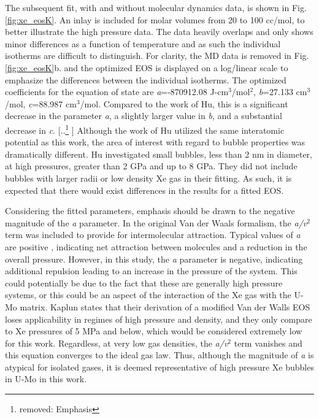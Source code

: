 \documentclass[review]{elsarticle}
\providecommand{\DIFaddtex}[1]{{\protect\color{blue} \sf #1}} %
\providecommand{\DIFdeltex}[1]{{\protect\color{red} [..\footnote{removed: #1} ]}} %
\providecommand{\DIFaddbegin}{} %
\providecommand{\DIFaddend}{} %
\providecommand{\DIFdelbegin}{} %
\providecommand{\DIFdelend}{} %
\providecommand{\DIFadd}[1]{\texorpdfstring{\DIFaddtex{#1}}{#1}} %
\providecommand{\DIFdel}[1]{\texorpdfstring{\DIFdeltex{#1}}{}} %
\newcommand{\DIFscaledelfig}{0.5}
\newlength{\DIFdelgraphicswidth} %
\newlength{\DIFdelgraphicsheight} %
\newcommand{\DIFaddincludegraphics}[2][]{{\color{blue}\fbox{\DIFOincludegraphics[#1]{#2}}}} %
\newcommand{\DIFdelincludegraphics}[2][]{%
\sbox{\DIFdelgraphicsbox}{\DIFOincludegraphics[#1]{#2}}%
\settoboxwidth{\DIFdelgraphicswidth}{\DIFdelgraphicsbox} %
\settoboxtotalheight{\DIFdelgraphicsheight}{\DIFdelgraphicsbox} %
\scalebox{\DIFscaledelfig}{%
\parbox[b]{\DIFdelgraphicswidth}{\usebox{\DIFdelgraphicsbox}\\[-\baselineskip] \rule{\DIFdelgraphicswidth}{0em}}\llap{\resizebox{\DIFdelgraphicswidth}{\DIFdelgraphicsheight}{%
\setlength{\unitlength}{\DIFdelgraphicswidth}%
\begin{picture}(1,1)%
\thicklines\linethickness{2pt} %
{\color[rgb]{1,0,0}\put(0,0){\framebox(1,1){}}}%
{\color[rgb]{1,0,0}\put(0,0){\line( 1,1){1}}}%
{\color[rgb]{1,0,0}\put(0,1){\line(1,-1){1}}}%
\end{picture}%
}\hspace*{3pt}}} %
} %
\DeclareRobustCommand{\DIFaddbegin}{\DIFOaddbegin \let\includegraphics\DIFaddincludegraphics} %
\DeclareRobustCommand{\DIFaddend}{\DIFOaddend \let\includegraphics\DIFOincludegraphics} %
\DeclareRobustCommand{\DIFdelbegin}{\DIFOdelbegin \let\includegraphics\DIFdelincludegraphics} %
\DeclareRobustCommand{\DIFdelend}{\DIFOaddend \let\includegraphics\DIFOincludegraphics} %
\begin{document}
The subsequent fit, with and without molecular dynamics data, is shown in Fig. \ref{fig:xe_eosK}. An inlay is included for molar volumes from 20 to 100 cc/mol, to better illustrate the high pressure data. The data heavily overlaps and only shows minor differences as a function of temperature and as such the individual isotherms are difficult to distinguish. For clarity, the MD data is removed in Fig. \ref{fig:xe_eosK}b. and the optimized EOS is displayed on a log/linear scale to emphasize the differences between the individual isotherms. The optimized coefficients for the equation of state are \textit{a}=-870912.08 J-cm$^3$/mol$^2$, \textit{b}=27.133 cm$^3$/mol, \textit{c}=88.987 cm$^3$/mol. Compared to the work of Hu, this is a significant decrease in the parameter \textit{a}, a slightly larger value in \textit{b}, and a substantial decrease in \textit{c}. \DIFdelbegin \DIFdel{Emphasis }\DIFdelend \DIFaddbegin \DIFadd{Although the work of Hu utilized the same interatomic potential as this work, the area of interest with regard to bubble properties was dramatically different. Hu investigated small bubbles, less than 2 nm in diameter, at high pressures, greater than 2 GPa and up to 8 GPa. They did not include bubbles with larger radii or low density Xe gas in their fitting.  As such, it is expected that there would exist differences in the results for a fitted EOS. 
}

\DIFadd{Considering the fitted parameters, emphasis }\DIFaddend should be drawn to the negative magnitude of the \textit{a} parameter. In the original Van der Waals formalism, the \textit{a/v$^2$} term was included to provide for intermolecular attraction. Typical values of \textit{a} are positive \cite{kaplun2003}, indicating net attraction between molecules and a reduction in the overall pressure. However, in this study, the \textit{a} parameter is negative, indicating additional repulsion leading to an increase in the pressure of the system. This could potentially be due to the fact that these are generally high pressure systems, or this could be an aspect of the interaction of the Xe gas with the U-Mo matrix. Kaplun states that their derivation of a modified Van der Walls EOS loses applicability in regimes of high pressure and density, and they only compare to Xe pressures of 5 MPa and below, which would be considered extremely low for this work. Regardless, at very low gas densities, the \textit{a/v$^2$} term vanishes and this equation converges to the ideal gas law. Thus, although the magnitude of \textit{a} is atypical for isolated gases, it is deemed representative of high pressure Xe bubbles in U-Mo in this work.
\end{document}
